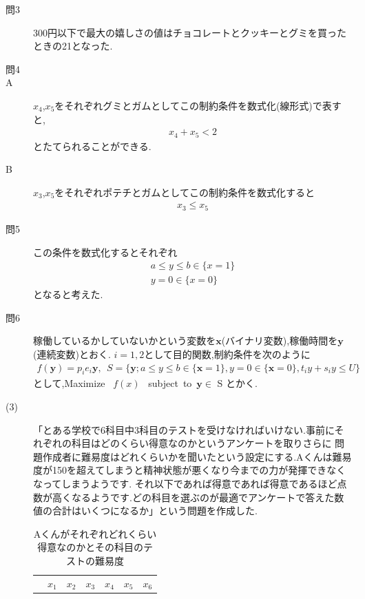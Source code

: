\documentclass[12pt]{jarticle}
\begin{document}
\begin{description}
	\item[問3]
	      300円以下で最大の嬉しさの値はチョコレートとクッキーとグミを買ったときの21となった. 
	\item[問4]
	\item[A]
	      $x_4$,$x_5$をそれぞれグミとガムとしてこの制約条件を数式化(線形式)で表すと,
	      \begin{eqnarray}
		      x_4+x_5<2\nonumber
	      \end{eqnarray}
	      とたてられることができる.
	\item[B]
	      $x_3$,$x_5$をそれぞれポテチとガムとしてこの制約条件を数式化すると
	      \begin{eqnarray}
		      x_3\leq x_5\nonumber
	      \end{eqnarray}
	\item[問5]
	      この条件を数式化するとそれぞれ
	      \begin{eqnarray}
		      a\leq y\leq b \in \{x=1\}\nonumber\\
		      y=0\in \{x=0\}\nonumber
	      \end{eqnarray}
	      となると考えた. 
	\item[問6]
	      稼働しているかしていないかという変数を$\boldsymbol{x}$(バイナリ変数),稼働時間を$\boldsymbol{y}$(連続変数)とおく.
	      $i=1,2$として目的関数,制約条件を次のように
	      \begin{eqnarray}
		      f(\boldsymbol{y})=p_ie_i\boldsymbol{y},\ \ S=\{\boldsymbol{y};a\leq y\leq b\in \{\boldsymbol{x}=1\},y=0\in \{\boldsymbol{x}=0\},t_iy+s_iy\leq U\}
	      \end{eqnarray}
	      として,Maximize \ $f(x)$ \ subject\ to\ $\boldsymbol{y}\in$ S とかく.
	\item[(3)]
	      「とある学校で6科目中3科目のテストを受けなければいけない.事前にそれぞれの科目はどのくらい得意なのかというアンケートを取りさらに
	      問題作成者に難易度はどれくらいかを聞いたという設定にする.Aくんは難易度が150を超えてしまうと精神状態が悪くなり今までの力が発揮できなくなってしまうようです.
	      それ以下であれば得意であれば得意であるほど点数が高くなるようです.どの科目を選ぶのが最適でアンケートで答えた数値の合計はいくつになるか」という問題を作成した.
	      \begin{table}[h]
		      \caption{Aくんがそれぞれどれくらい得意なのかとその科目のテストの難易度}
		      \begin{center}
			      \begin{tabular}{|c|c|c|c|c|c|c|}
				      \hline
				                   & $x_1$ & $x_2$ & $x_3$ & $x_4$ & $x_5$ & $x_6$ \\

\end{tabular}
\end{center}
\end{table}
\end{description}
\end{document}
